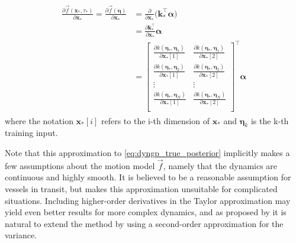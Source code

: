 \begin{align}\label{eq:gp_jacobian}
    \begin{split}
        \frac{\partial \vec{f}(\boldsymbol{x}_*, \tau_*)}{\partial \boldsymbol{x}_*} = \frac{\partial \vec{f}(\boldsymbol{\eta})}{\partial \boldsymbol{x}_*} &= \frac{\partial}{\partial \boldsymbol{x}_*} \bigg(\boldsymbol{k}_*^\intercal \boldsymbol{\alpha}\bigg)\\
        &= \frac{\partial \boldsymbol{k}_*^\intercal}{\partial \boldsymbol{x}_*} \boldsymbol{\alpha}\\
        &= \begin{bmatrix}
            \frac{\partial k(\boldsymbol{\eta}_*, \boldsymbol{\eta}_1)}{\partial \boldsymbol{x}_*[1]} & \frac{\partial k(\boldsymbol{\eta}_*, \boldsymbol{\eta}_1)}{\partial \boldsymbol{x}_*[2]} \\
            \frac{\partial k(\boldsymbol{\eta}_*, \boldsymbol{\eta}_2)}{\partial \boldsymbol{x}_*[1]} & \frac{\partial k(\boldsymbol{\eta}_*, \boldsymbol{\eta}_2)}{\partial \boldsymbol{x}_*[2]} \\
            \vdots                                                                                    & \vdots                                                                                    \\
            \frac{\partial k(\boldsymbol{\eta}_*, \boldsymbol{\eta}_N)}{\partial \boldsymbol{x}_*[1]} & \frac{\partial k(\boldsymbol{\eta}_*, \boldsymbol{\eta}_N)}{\partial \boldsymbol{x}_*[2]} \\
        \end{bmatrix}^\intercal \boldsymbol{\alpha}
    \end{split}
\end{align}
where the notation $\boldsymbol{x}_*[i]$ refers to the i-th dimension of $\boldsymbol{x}_*$ and $\boldsymbol{\eta}_k$ is the k-th training input.

Note that this approximation to \cref{eq:dyngp_true_posterior} implicitly makes a few assumptions about the motion model $\vec{f}$, namely that the dynamics are continuous and highly smooth. It is believed to be a reasonable assumption for vessels in transit, but makes this approximation unsuitable for complicated situations. Including higher-order derivatives in the Taylor approximation may yield even better results for more complex dynamics, and as proposed by \cite{multistep_gp} it is natural to extend the method by using a second-order approximation for the variance.

